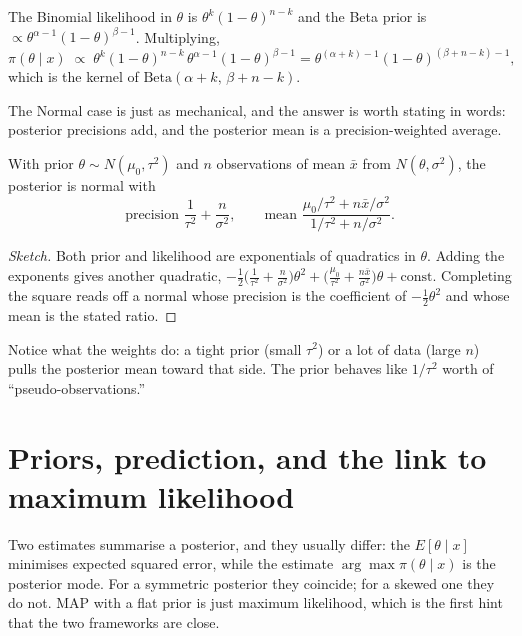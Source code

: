 \documentclass[11pt]{article}
\begin{document}
\begin{theorem}
The Binomial likelihood in $\theta$ is $\theta^{k}(1-\theta)^{n-k}$ and the
Beta prior is $\propto \theta^{\alpha-1}(1-\theta)^{\beta-1}$. Multiplying,
\[
  \pi(\theta\mid x) \;\propto\;
  \theta^{k}(1-\theta)^{n-k}\,\theta^{\alpha-1}(1-\theta)^{\beta-1}
  = \theta^{(\alpha+k)-1}(1-\theta)^{(\beta+n-k)-1},
\]
which is the kernel of $\mathrm{Beta}(\alpha+k,\,\beta+n-k)$.
\end{theorem}

The Normal case is just as mechanical, and the answer is worth stating in
words: posterior precisions add, and the posterior mean is a
precision-weighted average.

\begin{theorem}
With prior $\theta \sim N(\mu_0,\tau^2)$ and $n$ observations of mean
$\bar x$ from $N(\theta,\sigma^2)$, the posterior is normal with
\[
  \text{precision } \frac{1}{\tau^2} + \frac{n}{\sigma^2},
  \qquad
  \text{mean } \frac{\mu_0/\tau^2 + n\bar x/\sigma^2}{1/\tau^2 + n/\sigma^2}.
\]
\end{theorem}
\begin{proof}[Sketch]
Both prior and likelihood are exponentials of quadratics in $\theta$. Adding
the exponents gives another quadratic, $-\tfrac12\big(\tfrac{1}{\tau^2} +
\tfrac{n}{\sigma^2}\big)\theta^2 + \big(\tfrac{\mu_0}{\tau^2} +
\tfrac{n\bar x}{\sigma^2}\big)\theta + \text{const}$. Completing the square
reads off a normal whose precision is the coefficient of $-\tfrac12\theta^2$
and whose mean is the stated ratio.
\end{proof}

\noindent Notice what the weights do: a tight prior (small $\tau^2$) or a lot
of data (large $n$) pulls the posterior mean toward that side. The prior
behaves like $1/\tau^2$ worth of ``pseudo-observations.''

\section{Priors, prediction, and the link to maximum likelihood}

Two estimates summarise a posterior, and they usually differ: the
 $E[\theta\mid x]$ minimises expected squared error,
while the  estimate $\arg\max\pi(\theta\mid x)$ is the posterior
mode. For a symmetric posterior they coincide; for a skewed one they do not.
MAP with a flat prior is just maximum likelihood, which is the first hint
that the two frameworks are close.
\end{document}
